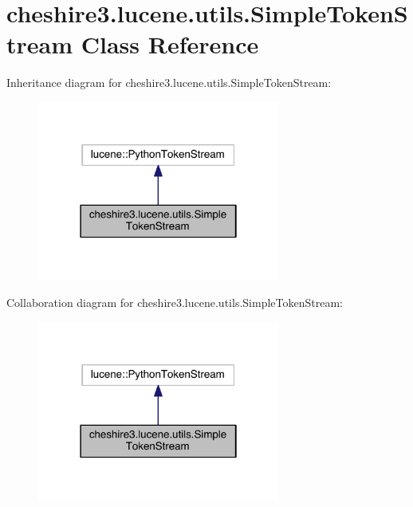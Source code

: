 \hypertarget{classcheshire3_1_1lucene_1_1utils_1_1_simple_token_stream}{\section{cheshire3.\-lucene.\-utils.\-Simple\-Token\-Stream Class Reference}
\label{classcheshire3_1_1lucene_1_1utils_1_1_simple_token_stream}
}


Inheritance diagram for cheshire3.\-lucene.\-utils.\-Simple\-Token\-Stream\-:
\nopagebreak
\begin{figure}[H]
\begin{center}
\leavevmode
\includegraphics[width=226pt]{classcheshire3_1_1lucene_1_1utils_1_1_simple_token_stream__inherit__graph}
\end{center}
\end{figure}


Collaboration diagram for cheshire3.\-lucene.\-utils.\-Simple\-Token\-Stream\-:
\nopagebreak
\begin{figure}[H]
\begin{center}
\leavevmode
\includegraphics[width=226pt]{classcheshire3_1_1lucene_1_1utils_1_1_simple_token_stream__coll__graph}
\end{center}
\end{figure}

